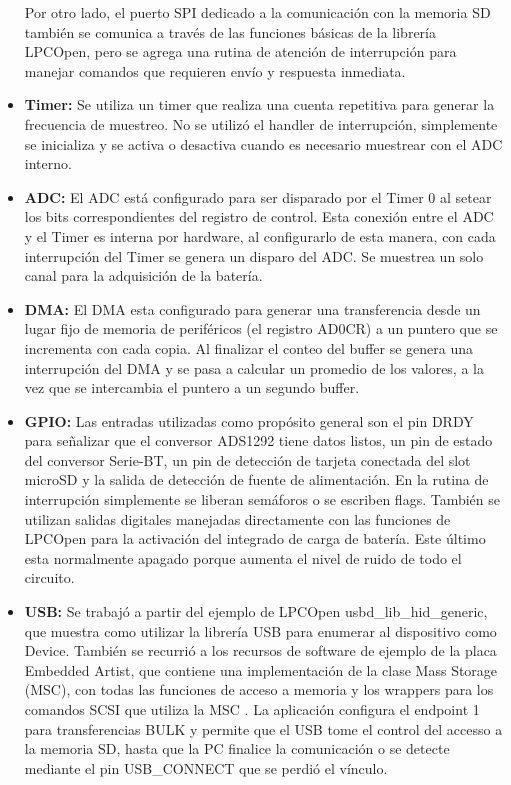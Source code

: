 \begin{itemize}
	Por otro lado, el puerto SPI dedicado a la comunicación con la memoria SD también se comunica a través de las funciones básicas de la librería LPCOpen, pero se agrega una rutina de atención de interrupción para manejar comandos que requieren envío y respuesta inmediata.

	\item \textbf{Timer:} Se utiliza un timer que realiza una cuenta repetitiva para generar la frecuencia de muestreo. No se utilizó el handler de interrupción, simplemente se inicializa y se activa o desactiva cuando es necesario muestrear con el ADC interno.

	\item \textbf{ADC:} El ADC está configurado para ser disparado por el Timer 0 al setear los bits correspondientes del registro de control. Esta conexión entre el ADC y el Timer es interna por hardware, al configurarlo de esta manera, con cada interrupción del Timer se genera un disparo del ADC. Se muestrea un solo canal para la adquisición de la batería.
	
	\item \textbf{DMA:} El DMA esta configurado para generar una transferencia desde un lugar fijo de memoria de periféricos (el registro AD0CR) a un puntero que se incrementa con cada copia. Al finalizar el conteo del buffer se genera una interrupción del DMA y se pasa a calcular un promedio de los valores, a la vez que se intercambia el puntero a un segundo buffer.
	
 	\item \textbf{GPIO:} Las entradas utilizadas como propósito general son el pin DRDY para señalizar que el conversor ADS1292 tiene datos listos, un pin de estado del conversor Serie-BT, un pin de detección de tarjeta conectada del slot microSD y la salida de detección de fuente de alimentación. En la rutina de interrupción simplemente se liberan semáforos o se escriben flags. También se utilizan salidas digitales manejadas directamente con las funciones de LPCOpen para la activación del integrado de carga de batería. Este último esta normalmente apagado porque aumenta el nivel de ruido de todo el circuito.

	\item \textbf{USB:} Se trabajó a partir del ejemplo de LPCOpen usbd\_lib\_hid\_generic, que muestra como utilizar la librería USB para enumerar al dispositivo como Device. También se recurrió a los recursos de software de ejemplo de la placa Embedded Artist\citep{ea2013}, que contiene una implementación de la clase Mass Storage (MSC), con todas las funciones de acceso a memoria y los wrappers para los comandos SCSI que utiliza la MSC \citep{arm2019} \citep{peacock2002} \citep{axelson2006}. La aplicación configura el endpoint 1 para transferencias BULK y permite que el USB tome el control del accesso a la memoria SD, hasta que la PC finalice la comunicación o se detecte mediante el pin USB\_CONNECT que se perdió el vínculo.

\end{itemize}

